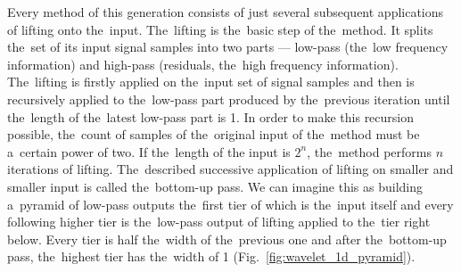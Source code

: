 Every method of this generation consists of just several subsequent applications of lifting onto the~input. The~lifting is the~basic step of the~method. It splits the~set of its input signal samples into two parts --- low-pass (the~low frequency information) and high-pass (residuals, the~high frequency information). The~lifting is firstly applied on the~input set of signal samples and then is recursively applied to the~low-pass part produced by the~previous iteration until the~length of the~latest low-pass part is 1. In order to make this recursion possible, the~count of samples of the~original input of the~method must be a~certain power of two. If the~length of the input is $2^n$, the~method performs $n$ iterations of lifting. The~described successive application of lifting on smaller and smaller input is called the~bottom-up pass. We can imagine this as building a~pyramid of low-pass outputs the~first tier of which is the~input itself and every following higher tier is the~low-pass output of lifting applied to the~tier right below. Every tier is half the~width of the~previous one and after the~bottom-up pass, the~highest tier has the~width of 1 (Fig.~\ref{fig:wavelet_1d_pyramid}).

